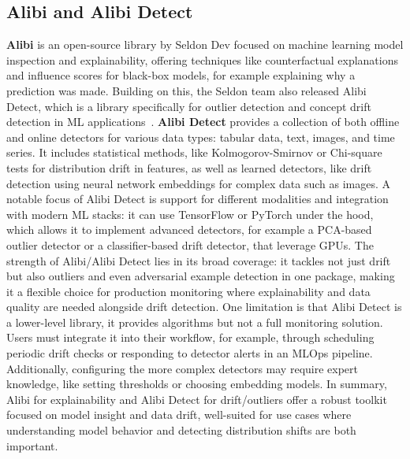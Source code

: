 \subsection{Alibi and Alibi Detect}
\textbf{Alibi} is an open-source library by Seldon Dev focused on machine learning model inspection and explainability, offering techniques like counterfactual explanations and influence scores for black-box models, for example explaining why a prediction was made.
Building on this, the Seldon team also released Alibi Detect, which is a library specifically for outlier detection and concept drift detection in ML applications~\cite{looveren2020alibi, mueller2024bench}.
\textbf{Alibi Detect} provides a collection of both offline and online detectors for various data types: tabular data, text, images, and time series.
It includes statistical methods, like Kolmogorov-Smirnov or Chi-square tests for distribution drift in features, as well as learned detectors, like drift detection using neural network embeddings for complex data such as images.
A notable focus of Alibi Detect is support for different modalities and integration with modern ML stacks: it can use TensorFlow or PyTorch under the hood, which allows it to implement advanced detectors, for example a PCA-based outlier detector or a classifier-based drift detector, that leverage GPUs.
The strength of Alibi/Alibi Detect lies in its broad coverage: it tackles not just drift but also outliers and even adversarial example detection in one package, making it a flexible choice for production monitoring where explainability and data quality are needed alongside drift detection.
One limitation is that Alibi Detect is a lower-level library, it provides algorithms but not a full monitoring solution.
Users must integrate it into their workflow, for example, through scheduling periodic drift checks or responding to detector alerts in an MLOps pipeline.
Additionally, configuring the more complex detectors may require expert knowledge, like setting thresholds or choosing embedding models.
In summary, Alibi for explainability and Alibi Detect for drift/outliers offer a robust toolkit focused on model insight and data drift, well-suited for use cases where understanding model behavior and detecting distribution shifts are both important.

